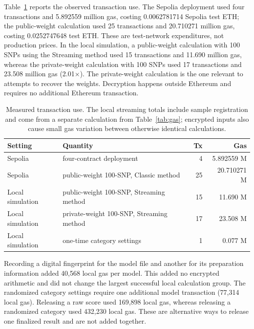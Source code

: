 \documentclass[10pt]{article}
\begin{document}
Table~\ref{tab:cost} reports the observed transaction use.  The Sepolia deployment used
four transactions and 5.892559 million gas, costing 0.0062781714 Sepolia test ETH; the
public-weight calculation used 25 transactions and 20.710271
million gas, costing 0.0252747648 test ETH.  These are test-network expenditures, not
production prices.  In the local simulation, a public-weight calculation with 100 SNPs
using the Streaming method used 15 transactions and 11.690 million gas, whereas the
private-weight calculation with 100 SNPs used 17 transactions and 23.508 million gas
(2.01$\times$).  The private-weight calculation is the one relevant to attempts to
recover the weights.  Decryption happens outside Ethereum and requires no additional
Ethereum transaction.

\begin{table}[ht]
\centering
\caption{Measured transaction use. The local streaming totals include sample
registration and come from a separate calculation from Table~\ref{tab:gas}; encrypted
inputs also cause small gas variation between otherwise identical calculations.}
\label{tab:cost}
\footnotesize
\setlength{\tabcolsep}{2pt}
\begin{tabularx}{\columnwidth}{@{}lXrr@{}}
\toprule
\textbf{Setting} & \textbf{Quantity} & \textbf{Tx} & \textbf{Gas} \\
\midrule
Sepolia & four-contract deployment & 4 & 5.892559 M \\
Sepolia & public-weight 100-SNP, Classic method & 25 & 20.710271 M \\
Local simulation & public-weight 100-SNP, Streaming method & 15 & 11.690 M \\
Local simulation & private-weight 100-SNP, Streaming method & 17 & 23.508 M \\
Local simulation & one-time category settings & 1 & 0.077 M \\
\bottomrule
\end{tabularx}
\end{table}

Recording a digital fingerprint for the model file and another for its preparation information
added 40,568 local gas per model. This added no encrypted arithmetic and did not change the
largest successful local calculation group.  The
randomized category settings require one additional model transaction (77,314 local gas).
Releasing a raw score used 169,898 local gas, whereas releasing a randomized category
used 432,230 local gas. These
are alternative ways to release one finalized result and are not added together.
\end{document}
